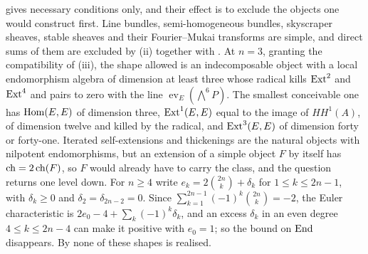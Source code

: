 \begin{remark}\label{rem:p2endo}
 gives necessary conditions only, and their effect is to
exclude the objects one would construct first. Line bundles, semi-homogeneous
bundles, skyscraper sheaves, stable sheaves and their Fourier--Mukai
transforms are simple, and direct sums of them are excluded by (ii) together
with . At $n=3$, granting the compatibility of
(iii), the shape allowed is an indecomposable object
with a local endomorphism algebra of dimension at least three whose radical
kills $\operatorname{Ext}^{2}$ and $\operatorname{Ext}^{4}$ and pairs to zero with the line
$\operatorname{ev}_{E}(\bigwedge^{6}P)$. The smallest conceivable one has
$\operatorname{Hom}(E,E)$ of dimension three, $\operatorname{Ext}^{1}(E,E)$ equal to the image of
$HH^{1}(A)$, of dimension twelve and killed by the radical, and
$\operatorname{Ext}^{3}(E,E)$ of dimension forty or forty-one. Iterated self-extensions and
thickenings are the natural objects with nilpotent endomorphisms, but an
extension of a simple object $F$ by itself has $\operatorname{ch}=2\operatorname{ch}(F)$, so $F$ would
already have to carry the class, and the question returns one level down.
For $n\ge4$ write $e_{k}=2\binom{2n}{k}+\delta_{k}$ for $1\le k\le2n-1$,
with $\delta_{k}\ge0$ and $\delta_{2}=\delta_{2n-2}=0$. Since
$\sum_{k=1}^{2n-1}(-1)^{k}\binom{2n}{k}=-2$, the Euler characteristic is
$2e_{0}-4+\sum_{k}(-1)^{k}\delta_{k}$, and an excess $\delta_{k}$ in an even
degree $4\le k\le2n-4$ can make it positive with $e_{0}=1$; so the bound on
$\operatorname{End}$ disappears. By
 none of these shapes is realised.
\end{remark}
